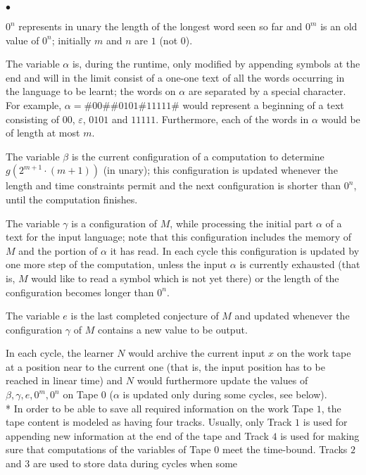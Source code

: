 \documentclass{LMCS}
\theoremstyle{plain}\newtheorem{athm}[thm]{Theorem}
\theoremstyle{plain}\newtheorem{aprop}[thm]{Proposition}
\theoremstyle{plain}\newtheorem{aprob}[thm]{Open Problem}
\theoremstyle{plain}\newtheorem{acor}[thm]{Corollary}
\theoremstyle{plain}\newtheorem{alem}[thm]{Lemma}
\theoremstyle{definition}\newtheorem{adefn}[thm]{Definition}
\theoremstyle{definition}\newtheorem{arem}[thm]{Remark}
\theoremstyle{plain}\newtheorem{aexmp}[thm]{Example}
\theoremstyle{plain}\newtheorem{aclm}[thm]{Claim}
\def\sp{\\*\indent}
\begin{document}
\begin{iteMize}{$\bullet$}
\item $0^n$ represents in unary the length of the longest word seen so far
and $0^m$ is an old value of $0^n$; initially $m$ and $n$ are $1$ (not $0$).
\item The variable $\alpha$ is, during the runtime,
only modified by appending symbols at the end and will in the limit
consist of a one-one text of all the words occurring in the language
to be learnt; the words on $\alpha$ are separated by a special character.
For example, $\alpha = \# 0 0 \# \# 0 1 0 1 \# 1 1 1 1 1 \#$
would represent a beginning of a text consisting of $00$, $\varepsilon$,
$0101$ and $11111$. Furthermore,
each of the words in $\alpha$ would be of length at most $m$.
\item The variable $\beta$ is the current
configuration of a computation to determine $g(2^{m+1} \cdot (m+1))$
(in unary);
this configuration is updated whenever the length and time constraints permit
and the next configuration is shorter than $0^n$, until the
computation finishes.
\item The variable $\gamma$ is a configuration of $M$, while processing the
initial part $\alpha$ of a text for the input language;
note that this configuration includes the memory of $M$ and the portion
of $\alpha$ it has read.
In each cycle this configuration is updated by one more step of the 
computation,
unless the input $\alpha$ is currently exhausted (that is, $M$ would like
to read a symbol which is not yet there) or the length of the configuration
becomes longer than $0^n$. 
\item The variable $e$ is the last completed conjecture of
$M$ and updated whenever the configuration $\gamma$ of $M$ contains a new
value to be output.
\end{iteMize}
In each cycle, the learner $N$ would archive the current
input $x$ on the work tape at a position near to the current one (that is, the
input position has to be reached in linear time) and $N$ would furthermore
update the values of $\beta,\gamma,e,0^m,0^n$ on Tape $0$ ($\alpha$ is
updated only
during some cycles, see below).
\sp
In order to be able to save all required information on the work Tape $1$,
the tape content is modeled as having four tracks. Usually,
only Track $1$ is used for appending new information at the end of the
tape and Track $4$ is used for making sure that computations of the
variables of Tape $0$ meet the time-bound. 
Tracks $2$ and $3$ are used to store data during cycles when some
\end{document}
